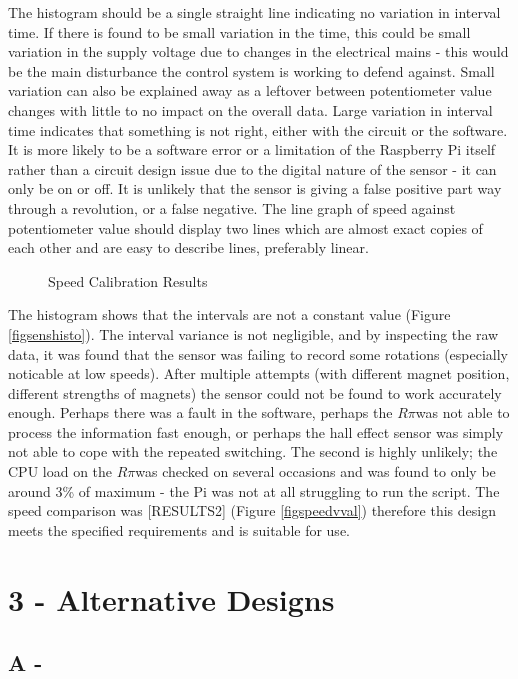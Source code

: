 \documentclass[twoside,a4]{report}
\def\br{\newline \newline \noindent}
\def\rpi{\(R\pi\)}
\begin{document}
The histogram should be a single straight line indicating no variation in interval time. If there is found to be small variation in the time, this could be small variation in the supply voltage due to changes in the electrical mains - this would be the main disturbance the control system is working to defend against. Small variation can also be explained away as a leftover between potentiometer value changes with little to no impact on the overall data. Large variation in interval time indicates that something is not right, either with the circuit or the software. It is more likely to be a software error or a limitation of the Raspberry Pi itself rather than a circuit design issue due to the digital nature of the sensor - it can only be on or off. It is unlikely that the sensor is giving a false positive part way through a revolution, or a false negative. \newline \newline \noindent
The line graph of speed against potentiometer value should display two lines which are almost exact copies of each other and are easy to describe lines, preferably linear.\br
	\begin{figure}[!htb]
		\centering
		\label{fig2speeds}
		\caption{Speed Calibration Results}
	\end{figure} \newline  \noindent
	The histogram shows that the intervals are not a constant value (Figure \ref{figsenshisto}). The interval variance is not negligible, and by inspecting the raw data, it was found that the sensor was failing to record some rotations (especially noticable at low speeds). After multiple attempts (with different magnet position, different strengths of magnets) the sensor could not be found to work accurately enough. Perhaps there was a fault in the software, perhaps the \rpi was not able to process the information fast enough, or perhaps the hall effect sensor was simply not able to cope with the repeated switching. The second is highly unlikely; the CPU load on the \rpi was checked on several occasions and was found to only be around 3\% of maximum - the Pi was not at all struggling to run the script.\br
	The speed comparison was [RESULTS2] (Figure \ref{figspeedvval}) therefore this design meets the specified requirements and is suitable for use.
\section{3 - Alternative Designs}
\subsection{A - }
\end{document}
